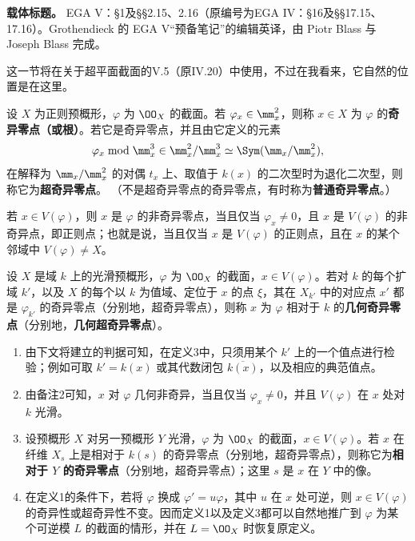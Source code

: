 \noindent\textbf{载体标题。} EGA V：§1及§§2.15、2.16（原编号为EGA IV：§16及§§17.15、17.16）。Grothendieck 的 EGA V“预备笔记”的编辑英译，由 Piotr Blass 与 Joseph Blass 完成。

这一节将在关于超平面截面的V.5（原IV.20）中使用，不过在我看来，它自然的位置是在这里。

设 $X$ 为正则预概形，$\varphi$ 为 $\OO_X$ 的截面。若 $\varphi_x\in\mm_x^2$，则称 $x\in X$ 为 $\varphi$ 的\textbf{奇异零点（或根）}。若它是奇异零点，并且由它定义的元素
\[
 \varphi_x\bmod\mm_x^3\in\mm_x^2/\mm_x^3\simeq\Sym(\mm_x/\mm_x^2),
\]
在解释为 $\mm_x/\mm_x^2$ 的对偶 $t_x$ 上、取值于 $k(x)$ 的二次型时为退化二次型，则称它为\textbf{超奇异零点}。
（不是超奇异零点的奇异零点，有时称为\textbf{普通奇异零点}。）

若 $x\in V(\varphi)$，则 $x$ 是 $\varphi$ 的非奇异零点，当且仅当 $\varphi_x\ne0$，且 $x$ 是 $V(\varphi)$ 的非奇异点，即正则点；也就是说，当且仅当 $x$ 是 $V(\varphi)$ 的正则点，且在 $x$ 的某个邻域中 $V(\varphi)\ne X$。

设 $X$ 是域 $k$ 上的光滑预概形，$\varphi$ 为 $\OO_X$ 的截面，$x\in V(\varphi)$。若对 $k$ 的每个扩域 $k'$，以及 $X$ 的每个以 $k$ 为值域、定位于 $x$ 的点 $\xi$，其在 $X_{k'}$ 中的对应点 $x'$ 都是 $\varphi_{k'}$ 的奇异零点（分别地，超奇异零点），则称 $x$ 为 $\varphi$ 相对于 $k$ 的\textbf{几何奇异零点}（分别地，\textbf{几何超奇异零点}）。

\begin{enumerate}[label=\alph*)]
\item 由下文将建立的判据可知，在定义3中，只须用某个 $k'$ 上的一个值点进行检验；例如可取 $k'=k(x)$ 或其代数闭包 $\overline{k(x)}$，以及相应的典范值点。
\item 由备注2可知，$x$ 对 $\varphi$ 几何非奇异，当且仅当 $\varphi_x\ne0$，并且 $V(\varphi)$ 在 $x$ 处对 $k$ 光滑。
\item 设预概形 $X$ 对另一预概形 $Y$ 光滑，$\varphi$ 为 $\OO_X$ 的截面，$x\in V(\varphi)$。若 $x$ 在纤维 $X_s$ 上是相对于 $k(s)$ 的奇异零点（分别地，超奇异零点），则称它为\textbf{相对于 $Y$ 的奇异零点}（分别地，超奇异零点）；这里 $s$ 是 $x$ 在 $Y$ 中的像。
\item 在定义1的条件下，若将 $\varphi$ 换成 $\varphi'=u\varphi$，其中 $u$ 在 $x$ 处可逆，则 $x\in V(\varphi)$ 的奇异性或超奇异性不变。因而定义1以及定义3都可以自然地推广到 $\varphi$ 为某个可逆模 $L$ 的截面的情形，并在 $L=\OO_X$ 时恢复原定义。
\end{enumerate}

